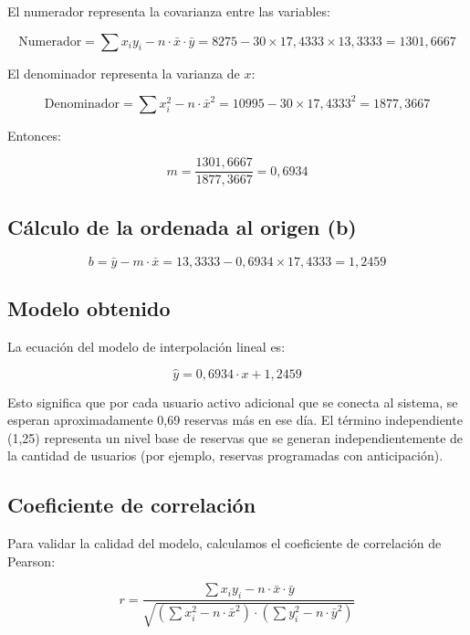 \documentclass[12pt,a4paper]{article}
\begin{document}
El numerador representa la covarianza entre las variables:

$$\text{Numerador} = \sum x_i y_i - n \cdot \bar{x} \cdot \bar{y} = 8275 - 30 \times 17{,}4333 \times 13{,}3333 = 1301{,}6667$$

El denominador representa la varianza de $x$:

$$\text{Denominador} = \sum x_i^2 - n \cdot \bar{x}^2 = 10995 - 30 \times 17{,}4333^2 = 1877{,}3667$$

Entonces:

$$m = \frac{1301{,}6667}{1877{,}3667} = 0{,}6934$$

\subsection{Cálculo de la ordenada al origen (b)}

\vspace{4pt}
$$b = \bar{y} - m \cdot \bar{x} = 13{,}3333 - 0{,}6934 \times 17{,}4333 = 1{,}2459$$

\subsection{Modelo obtenido}

La ecuación del modelo de interpolación lineal es:

\vspace{4pt}
$$\boxed{\hat{y} = 0{,}6934 \cdot x + 1{,}2459}$$
\vspace{4pt}

Esto significa que por cada usuario activo adicional que se conecta al sistema, se esperan aproximadamente 0,69 reservas más en ese día. El término independiente (1,25) representa un nivel base de reservas que se generan independientemente de la cantidad de usuarios (por ejemplo, reservas programadas con anticipación).

\subsection{Coeficiente de correlación}

Para validar la calidad del modelo, calculamos el coeficiente de correlación de Pearson:

\vspace{4pt}
$$r = \frac{\sum x_i y_i - n \cdot \bar{x} \cdot \bar{y}}{\sqrt{\left(\sum x_i^2 - n \cdot \bar{x}^2\right) \cdot \left(\sum y_i^2 - n \cdot \bar{y}^2\right)}}$$
\vspace{4pt}
\end{document}
